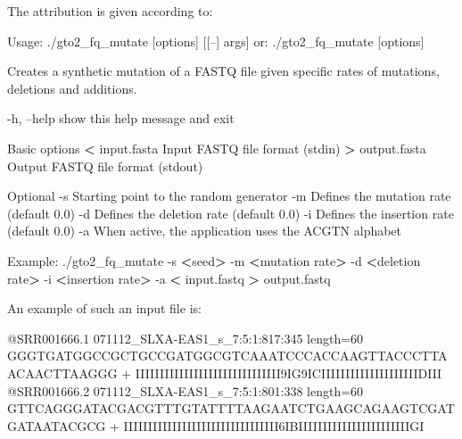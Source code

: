 \documentclass[11pt,]{krantz}
\newenvironment{Shaded}{\begin{snugshade}}{\end{snugshade}}
\newcommand{\OperatorTok}[1]{\textcolor[rgb]{0.43,0.43,0.43}{\textbf{#1}}}
\newcommand{\ExtensionTok}[1]{#1}
\newcommand{\NormalTok}[1]{#1}
\begin{document}
The attribution is given according to:

\begin{Shaded}
\begin{Highlighting}[]
\ExtensionTok{Usage}\NormalTok{: ./gto2_fq_mutate [options] [[--] args]}
   \ExtensionTok{or}\NormalTok{: ./gto2_fq_mutate [options]}

\ExtensionTok{Creates}\NormalTok{ a synthetic mutation of a FASTQ file given specific }
\ExtensionTok{rates}\NormalTok{ of mutations, deletions and additions.}

    \ExtensionTok{-h}\NormalTok{, --help      show this help message and exit}

\ExtensionTok{Basic}\NormalTok{ options}
    \OperatorTok{<} \ExtensionTok{input.fasta}\NormalTok{   Input FASTQ file format (stdin)}
    \OperatorTok{>} \ExtensionTok{output.fasta}\NormalTok{  Output FASTQ file format (stdout)}

\ExtensionTok{Optional}
    \ExtensionTok{-s}\NormalTok{              Starting point to the random generator}
    \ExtensionTok{-m}\NormalTok{              Defines the mutation rate (default 0.0)}
    \ExtensionTok{-d}\NormalTok{              Defines the deletion rate (default 0.0)}
    \ExtensionTok{-i}\NormalTok{              Defines the insertion rate (default 0.0)}
    \ExtensionTok{-a}\NormalTok{              When active, the application uses the }
                    \ExtensionTok{ACGTN}\NormalTok{ alphabet}

\ExtensionTok{Example}\NormalTok{: ./gto2_fq_mutate -s }\OperatorTok{<}\NormalTok{seed}\OperatorTok{>}\NormalTok{ -m }\OperatorTok{<}\NormalTok{mutation rate}\OperatorTok{>} 
\ExtensionTok{-d} \OperatorTok{<}\NormalTok{deletion rate}\OperatorTok{>}\NormalTok{ -i }\OperatorTok{<}\NormalTok{insertion rate}\OperatorTok{>}\NormalTok{ -a }
\OperatorTok{<} \ExtensionTok{input.fastq} \OperatorTok{>}\NormalTok{ output.fastq}
\end{Highlighting}
\end{Shaded}

An example of such an input file is:

\begin{Shaded}
\begin{Highlighting}[]
\ExtensionTok{@SRR001666.1}\NormalTok{ 071112_SLXA-EAS1_s_7:5:1:817:345 length=60}
\ExtensionTok{GGGTGATGGCCGCTGCCGATGGCGTCAAATCCCACCAAGTTACCCTTAACAACTTAAGGG}
\ExtensionTok{+}
\ExtensionTok{IIIIIIIIIIIIIIIIIIIIIIIIIIIIII9IG9ICIIIIIIIIIIIIIIIIIIIIDIII}
\ExtensionTok{@SRR001666.2}\NormalTok{ 071112_SLXA-EAS1_s_7:5:1:801:338 length=60}
\ExtensionTok{GTTCAGGGATACGACGTTTGTATTTTAAGAATCTGAAGCAGAAGTCGATGATAATACGCG}
\ExtensionTok{+}
\ExtensionTok{IIIIIIIIIIIIIIIIIIIIIIIIIIIIIIII6IBIIIIIIIIIIIIIIIIIIIIIIIGI}
\end{Highlighting}
\end{Shaded}
\end{document}
